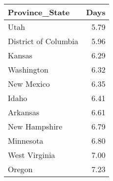 \begin{tabular}{lr}
\toprule
       Province\_State &  Days \\
\midrule
                 Utah &  5.79 \\
 District of Columbia &  5.96 \\
               Kansas &  6.29 \\
           Washington &  6.32 \\
           New Mexico &  6.35 \\
                Idaho &  6.41 \\
             Arkansas &  6.61 \\
        New Hampshire &  6.79 \\
            Minnesota &  6.80 \\
        West Virginia &  7.00 \\
               Oregon &  7.23 \\
\bottomrule
\end{tabular}
